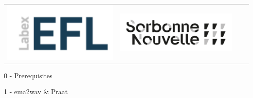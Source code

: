 \documentclass[12pt,a4paper]{beamer}
\begin{document}
\begin{frame}[plain]
\begin{tabular}{cccc}
        \includegraphics[scale=0.15]{../pictures/LabexEFL_logo.png} & 
        \includegraphics[scale=0.075]{../pictures/SN_logo.png}    
    \end{tabular}
\end{frame}

\frame{\tableofcontents}

\begin{frame}
    \begin{center}
        \vspace{2cm}
        \begin{LARGE}
            0 - Prerequisites
        \end{LARGE}
    \end{center}
\end{frame}



\begin{frame}
    \begin{center}
        \vspace{2cm}
        \begin{LARGE}
            1 - ema2wav \& Praat
        \end{LARGE}
    \end{center}
\end{frame}


\end{document}
